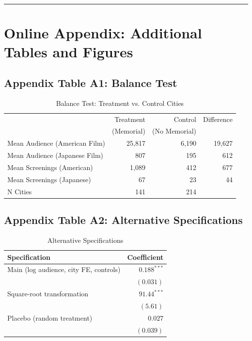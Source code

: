 \documentclass[12pt]{article}
\begin{document}
\vspace{2em}
\hrule
\vspace{1em}

\section*{Online Appendix: Additional Tables and Figures}

\subsection*{Appendix Table A1: Balance Test}

\begin{table}[H]
\centering
\caption{Balance Test: Treatment vs. Control Cities}
\label{tab:balance}
\begin{tabular}{lrrr}
\toprule
 & Treatment & Control & Difference \\
 & (Memorial) & (No Memorial) & \\
\midrule
Mean Audience (American Film) & 25,817 & 6,190 & 19,627 \\
Mean Audience (Japanese Film) & 807 & 195 & 612 \\
Mean Screenings (American) & 1,089 & 412 & 677 \\
Mean Screenings (Japanese) & 67 & 23 & 44 \\
N Cities & 141 & 214 & \\
\bottomrule
\end{tabular}
\end{table}

\subsection*{Appendix Table A2: Alternative Specifications}

\begin{table}[H]
\centering
\caption{Alternative Specifications}
\label{tab:alt}
\begin{tabular}{lr}
\toprule
Specification & Coefficient \\
\midrule
Main (log audience, city FE, controls) & $0.188^{***}$ \\
 & $(0.031)$ \\
Square-root transformation & $91.44^{***}$ \\
 & $(5.61)$ \\
Placebo (random treatment) & $0.027$ \\
 & $(0.039)$ \\
\bottomrule
\end{tabular}
\end{table}
\end{document}
